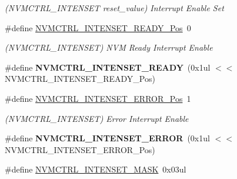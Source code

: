 \begin{DoxyCompactItemize}
\begin{DoxyCompactList}\small\item\em (N\+V\+M\+C\+T\+R\+L\+\_\+\+I\+N\+T\+E\+N\+S\+E\+T reset\+\_\+value) Interrupt Enable Set \end{DoxyCompactList}\item 
\hypertarget{group___s_a_m_l21___n_v_m_c_t_r_l_ga4eca7adfbfcaa40c9a3904c9c141058a}{}\#define \hyperlink{group___s_a_m_l21___n_v_m_c_t_r_l_ga4eca7adfbfcaa40c9a3904c9c141058a}{N\+V\+M\+C\+T\+R\+L\+\_\+\+I\+N\+T\+E\+N\+S\+E\+T\+\_\+\+R\+E\+A\+D\+Y\+\_\+\+Pos}~0\label{group___s_a_m_l21___n_v_m_c_t_r_l_ga4eca7adfbfcaa40c9a3904c9c141058a}

\begin{DoxyCompactList}\small\item\em (N\+V\+M\+C\+T\+R\+L\+\_\+\+I\+N\+T\+E\+N\+S\+E\+T) N\+V\+M Ready Interrupt Enable \end{DoxyCompactList}\item 
\hypertarget{group___s_a_m_l21___n_v_m_c_t_r_l_gaec9faf993409c2da8bc71efd88933666}{}\#define {\bfseries N\+V\+M\+C\+T\+R\+L\+\_\+\+I\+N\+T\+E\+N\+S\+E\+T\+\_\+\+R\+E\+A\+D\+Y}~(0x1ul $<$$<$ N\+V\+M\+C\+T\+R\+L\+\_\+\+I\+N\+T\+E\+N\+S\+E\+T\+\_\+\+R\+E\+A\+D\+Y\+\_\+\+Pos)\label{group___s_a_m_l21___n_v_m_c_t_r_l_gaec9faf993409c2da8bc71efd88933666}

\item 
\hypertarget{group___s_a_m_l21___n_v_m_c_t_r_l_gaac02b4043d398b4dc876e542fda447e0}{}\#define \hyperlink{group___s_a_m_l21___n_v_m_c_t_r_l_gaac02b4043d398b4dc876e542fda447e0}{N\+V\+M\+C\+T\+R\+L\+\_\+\+I\+N\+T\+E\+N\+S\+E\+T\+\_\+\+E\+R\+R\+O\+R\+\_\+\+Pos}~1\label{group___s_a_m_l21___n_v_m_c_t_r_l_gaac02b4043d398b4dc876e542fda447e0}

\begin{DoxyCompactList}\small\item\em (N\+V\+M\+C\+T\+R\+L\+\_\+\+I\+N\+T\+E\+N\+S\+E\+T) Error Interrupt Enable \end{DoxyCompactList}\item 
\hypertarget{group___s_a_m_l21___n_v_m_c_t_r_l_ga0ed8ea82f01157010d7c740abd3b80a2}{}\#define {\bfseries N\+V\+M\+C\+T\+R\+L\+\_\+\+I\+N\+T\+E\+N\+S\+E\+T\+\_\+\+E\+R\+R\+O\+R}~(0x1ul $<$$<$ N\+V\+M\+C\+T\+R\+L\+\_\+\+I\+N\+T\+E\+N\+S\+E\+T\+\_\+\+E\+R\+R\+O\+R\+\_\+\+Pos)\label{group___s_a_m_l21___n_v_m_c_t_r_l_ga0ed8ea82f01157010d7c740abd3b80a2}

\item 
\hypertarget{group___s_a_m_l21___n_v_m_c_t_r_l_gac49294b6f689477f53cabe7aba8a4975}{}\#define \hyperlink{group___s_a_m_l21___n_v_m_c_t_r_l_gac49294b6f689477f53cabe7aba8a4975}{N\+V\+M\+C\+T\+R\+L\+\_\+\+I\+N\+T\+E\+N\+S\+E\+T\+\_\+\+M\+A\+S\+K}~0x03ul\label{group___s_a_m_l21___n_v_m_c_t_r_l_gac49294b6f689477f53cabe7aba8a4975}


\end{DoxyCompactItemize}
